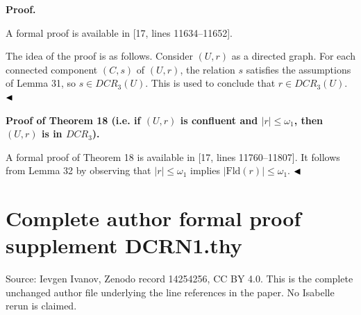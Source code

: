 \documentclass[10pt,a4paper]{amsart}
\begin{document}
 
 
 
\par\medskip\noindent\textbf{Proof.}\par
 
 
A formal proof is available in [17, lines 11634–11652].\par
 
 
 
The idea of the proof is as follows. Consider $(U,r)$ as a directed graph. For each connected component $(C,s)$ of $(U,r)$, the relation $s$ satisfies the assumptions of Lemma 31, so $s\in DCR_{3}(U)$. This is used to conclude that $r\in DCR_{3}(U)$. $\hfill\blacktriangleleft$\par
 
 
 
 
\par\medskip\noindent\textbf{Proof of Theorem 18 (i.e. if $(U,r)$ is confluent and $|r|\leq\omega_{1}$, then $(U,r)$ is in $DCR_{3}$).}\par
 
 
A formal proof of Theorem 18 is available in [17, lines 11760–11807]. It follows from Lemma 32 by observing that $|r|\leq\omega_{1}$ implies $|\mathrm{Fld}(r)|\leq\omega_{1}$. $\hfill\blacktriangleleft$\par
 
 
 
 

\clearpage
\section*{Complete author formal proof supplement DCRN1.thy}
Source: Ievgen Ivanov, Zenodo record 14254256, CC BY 4.0. This is the complete unchanged author file underlying the line references in the paper. No Isabelle rerun is claimed.

\end{document}
